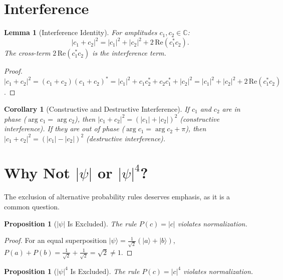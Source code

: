 \documentclass[12pt,a4paper]{article}
\newtheorem{lemma}[theorem]{Lemma}
\newtheorem{corollary}[theorem]{Corollary}
\newtheorem{proposition}[theorem]{Proposition}
\theoremstyle{definition}
\theoremstyle{remark}
\begin{document}
\section{Interference}
\label{sec:interference}

\begin{lemma}[Interference Identity]
\label{thm:interference}
For amplitudes $c_1, c_2 \in \mathbb{C}$:
\begin{equation}
  |c_1 + c_2|^2 = |c_1|^2 + |c_2|^2
  + 2\,\mathrm{Re}(c_1^* c_2).
\end{equation}
The cross-term $2\,\mathrm{Re}(c_1^* c_2)$ is the interference
term.
\end{lemma}

\begin{proof}
$|c_1 + c_2|^2 = (c_1 + c_2)(c_1 + c_2)^*
= |c_1|^2 + c_1 c_2^* + c_2 c_1^* + |c_2|^2
= |c_1|^2 + |c_2|^2 + 2\,\mathrm{Re}(c_1^* c_2)$.
\end{proof}

\begin{corollary}[Constructive and Destructive Interference]
If $c_1$ and $c_2$ are \emph{in phase} ($\arg c_1 = \arg c_2$),
then $|c_1 + c_2|^2 = (|c_1| + |c_2|)^2$ (constructive
interference).  If they are \emph{out of phase}
($\arg c_1 = \arg c_2 + \pi$), then
$|c_1 + c_2|^2 = (|c_1| - |c_2|)^2$ (destructive interference).
\end{corollary}

\section{Why Not $|\psi|$ or $|\psi|^4$?}
\label{sec:exclusion}

The exclusion of alternative probability rules deserves
emphasis, as it is a common question.

\begin{proposition}[$|\psi|$ Is Excluded]
\label{prop:exclude1}
The rule $P(c) = |c|$ violates normalization.
\end{proposition}

\begin{proof}
For an equal superposition $|\psi\rangle =
\frac{1}{\sqrt{2}}(|a\rangle + |b\rangle)$,
$P(a) + P(b) = \frac{1}{\sqrt{2}} + \frac{1}{\sqrt{2}}
= \sqrt{2} \neq 1$.
\end{proof}

\begin{proposition}[$|\psi|^4$ Is Excluded]
\label{prop:exclude4}
The rule $P(c) = |c|^4$ violates normalization.
\end{proposition}
\end{document}
